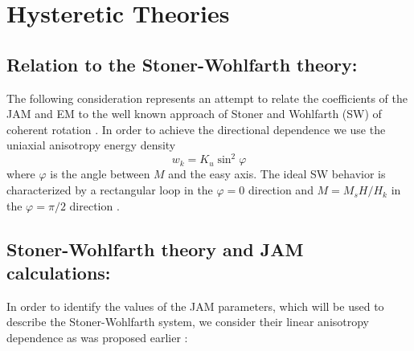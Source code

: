 \documentclass[../main.tex]{subfiles}
\begin{document}
\section{Hysteretic Theories}

\subsection{Relation to the Stoner-Wohlfarth theory:}

The following consideration represents an attempt to relate the coefficients of the JAM and EM
to the well known approach of Stoner and Wohlfarth (SW) of coherent rotation \cite{Stoner48}.
In order to achieve the directional dependence we use the uniaxial anisotropy
energy density
\begin{equation}
  w_k = K_u \sin^2\varphi
\end{equation}
where $\varphi$ is the angle between $M$ and the easy axis. The ideal SW
behavior is characterized by a rectangular loop in the $\varphi=0$ direction
and $M=M_sH/H_k$ in the $\varphi=\pi/2$ direction \cite{Stoner48}.


\subsection{Stoner-Wohlfarth theory and JAM calculations:}

In order to identify the values of the JAM parameters, which will be used to describe the
Stoner-Wohlfarth system, we consider their linear anisotropy dependence as was
proposed earlier \cite{JMMM}:
\end{document}
